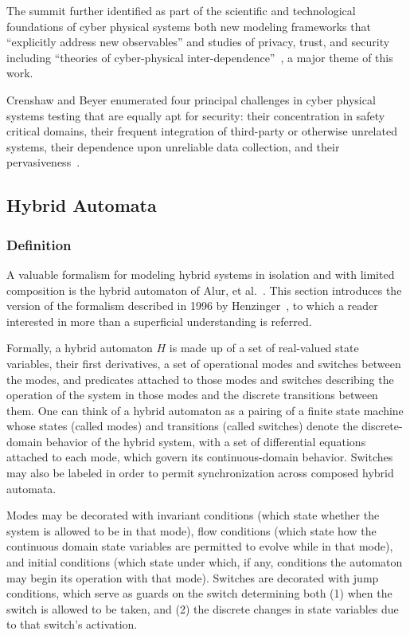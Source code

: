 The summit further identified as part of the scientific and technological foundations of
cyber physical systems both new modeling frameworks that ``explicitly address new observables'' and 
studies of privacy, trust, and security including ``theories of cyber-physical inter-dependence''~\cite{summitreport2008},
a major theme of this work.

Crenshaw and Beyer enumerated four principal challenges in cyber physical systems testing that are
equally apt for security:
their concentration in safety critical domains, their frequent integration of third-party or
otherwise unrelated systems, their dependence upon unreliable data collection, and their
pervasiveness~\cite{crenshaw2010upbot}.
\subsection{Hybrid Automata}
\subsubsection{Definition}
A valuable formalism for modeling hybrid systems in isolation and with limited composition
is the hybrid automaton of Alur, et al.~\cite{alur1993hybrid}. This section introduces the
version of the formalism described in 1996 by Henzinger~\cite{henzinger1996theory}, to which a
reader interested in more than a superficial understanding is referred. 

Formally,
a hybrid automaton $H$ is made up of a set of real-valued state variables, their first derivatives,
a set of operational modes and switches between the modes, and predicates attached to those modes and
switches describing the operation of the system in those modes and the discrete transitions between
them. One can think of a hybrid automaton as a pairing of a finite state machine whose states (called
modes) and transitions (called switches) denote the discrete-domain behavior of the hybrid system, with
a set of differential equations attached to each mode, which govern its continuous-domain behavior. Switches
may also be labeled in order to permit synchronization across composed hybrid automata.

Modes may be decorated with invariant conditions (which state whether the system is allowed to be in that mode),
flow conditions (which state how the continuous domain state variables are permitted to evolve while in that
mode), and initial conditions (which state under which, if any, conditions the automaton may begin its operation
with that mode). Switches are decorated with jump conditions, which serve as guards on the switch determining
both (1) when the switch is allowed to be taken, and (2) the discrete changes in state variables due to that
switch's activation.

